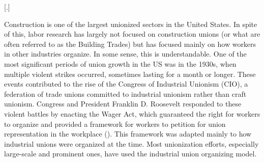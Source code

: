 \documentclass[12pt]{article}
\newlength{\myindent}
\begin{document}
\tableofcontents
\newpage

\listoffigures
\newpage

[.]



Construction is one of the largest unionized sectors in the United States. In spite of this, labor research has largely not focused on construction unions (or what are often referred to as the Building Trades) but has focused mainly on how workers in other industries organize. In some sense, this is understandable. One of the most significant periods of union growth in the US was in the 1930s, when multiple violent strikes occurred, sometimes lasting for a month or longer. These events contributed to the rise of the Congress of Industrial Unionism (CIO), a federation of trade unions committed to industrial unionism rather than craft unionism. Congress and President Franklin D. Roosevelt responded to these violent battles by enacting the Wager Act, which guaranteed the right for workers to organize and provided a framework for workers to petition for union representation in the workplace (\cite{grossMakingNationalLabor1974}). This framework was adapted mainly to how industrial unions were organized at the time. Most unionization efforts, especially large-scale and prominent ones, have used the industrial union organizing model.
\end{document}
